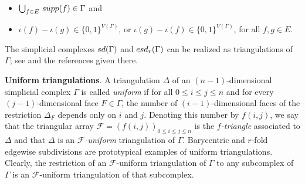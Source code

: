 \documentclass[11pt]{amsart}
\newcommand{\esd}{{\rm esd}}
\newcommand{\sd}{{\rm sd}}
\newcommand{\supp}{{\rm supp}}
\newcommand{\fF}{{\mathcal F}}
\begin{document}
\begin{itemize}
\itemsep=0pt
\item[$\bullet$]
$\bigcup_{f \in E} \, \supp(f) \in \Gamma$ and

\item[$\bullet$]
$\iota(f) - \iota(g) \in \{0, 1\}^{V(\Gamma)}$, or 
$\iota(g) - \iota(f) \in \{0, 1\}^{V(\Gamma)}$, for 
all $f, g \in E$.
\end{itemize}

The simplicial complexes $\sd(\Gamma)$ and 
$\esd_r(\Gamma)$ can be realized as triangulations 
of $\Gamma$; see \cite{Ath16b} 
\cite[Section~9.3]{Bj95} \cite[Section~3.2]{MW17}
and the references given there. 

\medskip
\noindent
\textbf{Uniform triangulations}. A triangulation 
$\Delta$ of an $(n-1)$-dimensional simplicial 
complex $\Gamma$ is called \emph{uniform} 
\cite{Ath22} if for all $0 \le i \le j \le n$ and 
for every $(j-1)$-dimensional face $F \in \Gamma$,
the number of $(i-1)$-dimensional faces of the 
restriction $\Delta_F$ depends only on $i$ and $j$.
Denoting this number by $f(i,j)$, we say that the
triangular array $\fF = (f(i,j))_{0 \le i \le j \le 
n}$ is the \emph{$f$-triangle} associated to $\Delta$ 
and that $\Delta$ is an \emph{$\fF$-uniform} 
triangulation of $\Gamma$. Barycentric and $r$-fold
edgewise subdivisions are prototypical examples of
uniform triangulations. Clearly, the restriction of 
an $\fF$-uniform triangulation of $\Gamma$ to any 
subcomplex of $\Gamma$ is an $\fF$-uniform 
triangulation of that subcomplex.
\end{document}
